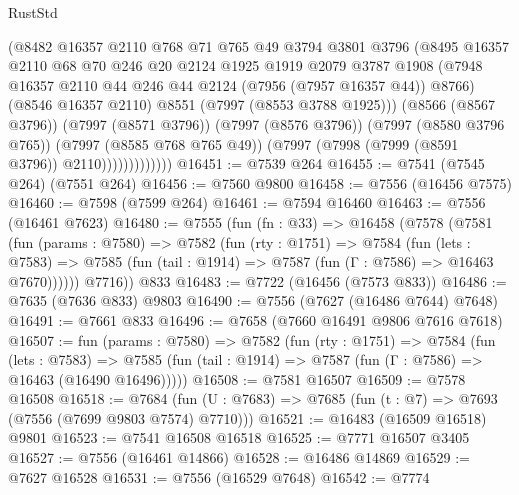 \begin{lexlean}{RustStd}
\begin{coremodule}
{\begin{coremodule}
{{{{{{{{{{{{{{{{{{{{{{{{{{{{{{{{{{{{{{{{{{{                        (@8482
                          @16357
                          @2110
                          @768
                          @71
                          @765
                          @49
                          @3794
                          @3801
                          @3796
                          (@8495
                            @16357
                            @2110
                            @68
                            @70
                            @246
                            @20
                            @2124
                            @1925
                            @1919
                            @2079
                            @3787
                            @1908
                            (@7948 @16357 @2110 @44 @246 @44 @2124 (@7956 (@7957 @16357 @44)) @8766)
                            (@8546 @16357 @2110)
                            @8551
                            (@7997 (@8553 @3788 @1925)))
                          (@8566 (@8567 @3796))
                          (@7997 (@8571 @3796))
                          (@7997 (@8576 @3796))
                          (@7997 (@8580 @3796 @765))
                          (@7997 (@8585 @768 @765 @49))
                          (@7997 (@7998 (@7999 (@8591 @3796)) @2110)))))))))))))
@16451 := @7539 @264
@16455 := @7541 (@7545 @264) (@7551 @264)
@16456 := @7560 @9800
@16458 := @7556 (@16456 @7575)
@16460 := @7598 (@7599 @264)
@16461 := @7594 @16460
@16463 := @7556 (@16461 @7623)
@16480 := @7555
    (fun (fn : @33) =>
    @16458
      (@7578
        (@7581
          (fun (params : @7580) =>
          @7582
            (fun (rty : @1751) =>
            @7584
              (fun (lets : @7583) =>
              @7585 (fun (tail : @1914) => @7587 (fun (Γ : @7586) => @16463 @7670))))))
        @7716))
    @833
@16483 := @7722 (@16456 (@7573 @833))
@16486 := @7635 (@7636 @833) @9803
@16490 := @7556 (@7627 (@16486 @7644) @7648)
@16491 := @7661 @833
@16496 := @7658 (@7660 @16491 @9806 @7616 @7618)
@16507 := fun (params : @7580) =>
  @7582
    (fun (rty : @1751) =>
    @7584
      (fun (lets : @7583) =>
      @7585 (fun (tail : @1914) => @7587 (fun (Γ : @7586) => @16463 (@16490 @16496)))))
@16508 := @7581 @16507
@16509 := @7578 @16508
@16518 := @7684 (fun (U : @7683) => @7685 (fun (t : @7) => @7693 (@7556 (@7699 @9803 @7574) @7710)))
@16521 := @16483 (@16509 @16518) @9801
@16523 := @7541 @16508 @16518
@16525 := @7771 @16507 @3405
@16527 := @7556 (@16461 @14866)
@16528 := @16486 @14869
@16529 := @7627 @16528
@16531 := @7556 (@16529 @7648)
@16542 := @7774
}}}}}}}}}}}}}}}}}}}}}}}}}}}}}}}}}}}}}}}}}}}
\end{coremodule}}
\end{coremodule}
\end{lexlean}
